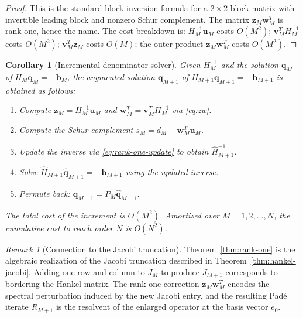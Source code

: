 \documentclass[11pt]{article}
\newtheorem{corollary}[theorem]{Corollary}
\theoremstyle{definition}
\theoremstyle{remark}
\newtheorem{remark}[theorem]{Remark}
\begin{document}
\begin{proof}
This is the standard block inversion formula for a $2\times 2$ block matrix with invertible leading block and nonzero Schur complement. The matrix $\mathbf{z}_{M}\mathbf{w}_{M}^{T}$ is rank one, hence the name. The cost breakdown is: $H_{M}^{-1}\mathbf{u}_{M}$ costs $O(M^{2})$; $\mathbf{v}_{M}^{T}H_{M}^{-1}$ costs $O(M^{2})$; $\mathbf{v}_{M}^{T}\mathbf{z}_{M}$ costs $O(M)$; the outer product $\mathbf{z}_{M}\mathbf{w}_{M}^{T}$ costs $O(M^{2})$.
\end{proof}

\begin{corollary}[Incremental denominator solver]
\label{cor:incremental-solver}
Given $H_{M}^{-1}$ and the solution $\mathbf{q}_{M}$ of $H_{M}\mathbf{q}_{M}=-\mathbf{b}_{M}$, the augmented solution $\mathbf{q}_{M+1}$ of $H_{M+1}\mathbf{q}_{M+1}=-\mathbf{b}_{M+1}$ is obtained as follows:
\begin{enumerate}[label=(\roman*)]
\item Compute $\mathbf{z}_{M}=H_{M}^{-1}\mathbf{u}_{M}$ and $\mathbf{w}_{M}^{T}=\mathbf{v}_{M}^{T}H_{M}^{-1}$ via \eqref{eq:zw}.
\item Compute the Schur complement $s_{M}=d_{M}-\mathbf{w}_{M}^{T}\mathbf{u}_{M}$.
\item Update the inverse via \eqref{eq:rank-one-update} to obtain $\hat{H}_{M+1}^{-1}$.
\item Solve $\hat{H}_{M+1}\hat{\mathbf{q}}_{M+1}=-\mathbf{b}_{M+1}$ using the updated inverse.
\item Permute back: $\mathbf{q}_{M+1}=P_{M}\hat{\mathbf{q}}_{M+1}$.
\end{enumerate}
The total cost of the increment is $O(M^{2})$. Amortized over $M=1,2,\ldots,N$, the cumulative cost to reach order $N$ is $O(N^{2})$.
\end{corollary}

\begin{remark}[Connection to the Jacobi truncation]
\label{rem:jacobi-update}
Theorem~\ref{thm:rank-one} is the algebraic realization of the Jacobi truncation described in Theorem~\ref{thm:hankel-jacobi}. Adding one row and column to $J_{M}$ to produce $J_{M+1}$ corresponds to bordering the Hankel matrix. The rank-one correction $\mathbf{z}_{M}\mathbf{w}_{M}^{T}$ encodes the spectral perturbation induced by the new Jacobi entry, and the resulting Pad\'e iterate $R_{M+1}$ is the resolvent of the enlarged operator at the basis vector $e_{0}$.
\end{remark}
\end{document}
